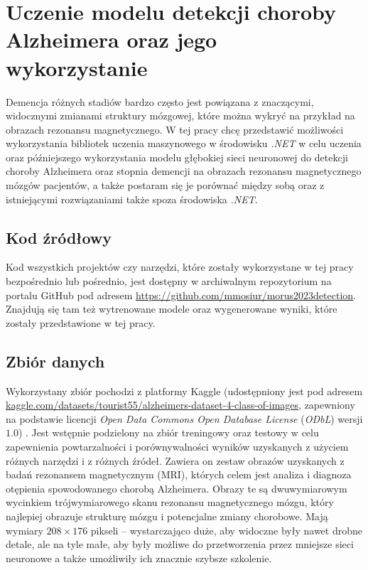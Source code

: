 \chapter{Uczenie modelu detekcji choroby Alzheimera oraz jego wykorzystanie}

Demencja różnych stadiów bardzo często jest powiązana z znaczącymi, widocznymi zmianami struktury mózgowej, które można wykryć na przykład na obrazach rezonansu magnetycznego.
W tej pracy chcę przedstawić możliwości wykorzystania bibliotek uczenia maszynowego w środowisku \emph{.NET} w celu uczenia oraz późniejszego wykorzystania modelu głębokiej sieci neuronowej do detekcji choroby Alzheimera oraz stopnia demencji na obrazach rezonansu magnetycznego mózgów pacjentów, a także postaram się je porównać między sobą oraz z istniejącymi rozwiązaniami także spoza środowiska \emph{.NET}.

\section{Kod źródłowy}
\label{sec:source-code}

Kod wszystkich projektów czy narzędzi, które zostały wykorzystane w tej pracy bezpośrednio lub pośrednio, jest dostępny w archiwalnym repozytorium na portalu GitHub pod adresem \url{https://github.com/mmosiur/morus2023detection}.
Znajdują się tam też wytrenowane modele oraz wygenerowane wyniki, które zostały przedstawione w tej pracy.

\section{Zbiór danych}
\label{sec:dataset}

Wykorzystany zbiór pochodzi z platformy Kaggle (udostępniony jest pod adresem \url{kaggle.com/datasets/tourist55/alzheimers-dataset-4-class-of-images}, zapewniony na podstawie licencji \emph{Open Data Commons Open Database License} (\emph{ODbL}) wersji $1.0$) \cite{kaggle-alzheimers-dataset}.
Jest wstępnie podzielony na zbiór treningowy oraz testowy w celu zapewnienia powtarzalności i porównywalności wyników uzyskanych z użyciem różnych narzędzi i z różnych źródeł.
Zawiera on zestaw obrazów uzyskanych z badań rezonansem magnetycznym (MRI), których celem jest analiza i diagnoza otępienia spowodowanego chorobą Alzheimera.
Obrazy te są dwuwymiarowym wycinkiem trójwymiarowego skanu rezonansu magnetycznego mózgu, który najlepiej obrazuje strukturę mózgu i potencjalne zmiany chorobowe.
Mają wymiary $208 \times 176$ pikseli -- wystarczająco duże, aby widoczne były nawet drobne detale, ale na tyle małe, aby były możliwe do przetworzenia przez mniejsze sieci neuronowe a także umożliwiły ich znacznie szybsze szkolenie.

